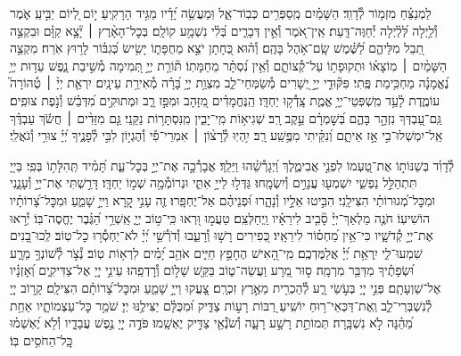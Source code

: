 \documentclass[twoside, openany, parskip=half, 11pt]{book}
\begin{document}
\begin{narrow}
לַמְנַצֵּ֗חַ מִזְמ֥וֹר לְ֯דָוִֽד׃
הַשָּׁמַ֗יִם מְֽסַפְּרִ֥ים כְּבֽוֹד־אֵ֑ל וּֽמַעֲשֵׂ֥ה יָ֝דָ֗יו מַגִּ֥יד הָרָקִֽיעַ׃
י֣וֹם לְ֭יוֹם יַבִּ֣יעַֽ אֹ֑מֶר וְ֯לַ֥יְלָה לְּ֝לַ֗יְלָה יְ֯חַוֶּה־דָּֽעַת׃
אֵֽין־אֹ֭מֶר וְ֯אֵ֣ין דְּבָרִ֑ים בְּ֝לִ֗י נִשְׁמָ֥ע קוֹלָֽם׃
בְּכׇל־הָאָ֨רֶץ ׀ יָ֘צָ֤א קַוָּ֗ם וּבִקְצֵ֣ה תֵ֭בֵל מִלֵּיהֶ֑ם לַ֝שֶּׁ֗מֶשׁ שָֽׂם־אֹ֥הֶל בָּהֶֽם׃
וְ֯ה֗וּא כְּ֭חָתָן יֹצֵ֣א מֵחֻפָּת֑וֹ יָשִׂ֥ישׂ כְּ֝גִבּ֗וֹר לָר֥וּץ אֹֽרַח׃
מִקְצֵ֤ה הַשָּׁמַ֨יִם ׀ מֽוֹצָא֗וֹ וּתְקוּפָת֥וֹ עַל־קְ֯צוֹתָ֑ם וְ֯אֵ֥ין נִ֝סְתָּ֗ר מֵחַמָּתֽוֹ׃
תּ֘וֹרַ֤ת יְיָ֣ תְּ֭מִימָה מְ֯שִׁ֣יבַת נָ֑פֶשׁ עֵד֥וּת יְיָ֥ נֶ֝אֱמָנָ֗ה מַחְכִּ֥ימַת פֶּֽתִי׃
פִּקּ֘וּדֵ֤י יְיָ֣ יְ֭שָׁרִים מְ֯שַׂמְּחֵי־לֵ֑ב מִצְוַ֥ת יְיָ֥ בָּ֝רָ֗ה מְ֯אִירַ֥ת עֵינָֽיִם׃
יִרְאַ֤ת יְיָ֨ ׀ טְ֯הוֹרָה֮ עוֹמֶ֢דֶת לָ֫עַ֥ד מִֽשְׁפְּטֵי־יְיָ֥ אֱמֶ֑ת צָֽדְ֯ק֥וּ יַחְדָּֽו׃
הַֽנֶּחֱמָדִ֗ים מִ֭זָּהָב וּמִפַּ֣ז רָ֑ב וּמְתוּקִ֥ים מִ֝דְּבַ֗שׁ וְ֯נֹ֣פֶת צוּפִֽים׃
גַּֽם־עַ֭בְדְּךָ נִזְהָ֣ר בָּהֶ֑ם בְּ֝שׇׁמְרָ֗ם עֵ֣קֶב רָֽב׃
שְׁגִיא֥וֹת מִֽי־יָבִ֑ין מִֽנִּסְתָּר֥וֹת נַקֵּֽנִי׃
גַּ֤ם מִזֵּדִ֨ים ׀ חֲשֹׂ֬ךְ עַבְדֶּ֗ךָ אַֽל־יִמְשְׁלוּ־בִ֣י אָ֣ז אֵיתָ֑ם וְ֝נִקֵּ֗יתִי מִפֶּ֥שַֽׁע רָֽב׃
יִ֥הְיֽוּ לְ֯רָצ֨וֹן ׀ אִמְרֵי־פִ֡י וְ֯הֶגְי֣וֹן לִבִּ֣י לְ֯פָנֶ֑יךָ יְ֝יָ֗ צוּרִ֥י וְ֯גֹאֲלִֽי׃


\enlargethispage{\baselineskip}

לְ֯דָוִ֗ד
בְּשַׁנּוֹת֣וֹ אֶת־טַ֭עְמוֹ לִפְנֵ֣י אֲבִימֶ֑לֶךְ וַ֝יְגָרְ֯שֵׁ֗הוּ וַיֵּלַֽךְ׃
אֲבָרְ֯כָ֣ה אֶת־יְיָ֣ בְּכׇל־עֵ֑ת תָּ֝מִ֗יד תְּֽהִלָּת֥וֹ בְּפִֽי׃
בַּייָ֭ תִּתְהַלֵּ֣ל נַפְשִׁ֑י יִשְׁמְע֖וּ עֲנָוִ֣ים וְ֯יִשְׂמָֽחוּ׃
גַּדְּל֣וּ לַייָ֣ אִתִּ֑י וּנְרוֹמְ֯מָ֖ה שְׁמ֣וֹ יַחְדָּֽו׃
דָּרַ֣שְׁתִּי אֶת־יְיָ֣ וְ֯עָנָ֑נִי וּמִכׇּל־מְ֝גוּרוֹתַ֗י הִצִּילָֽנִי׃
הִבִּ֣יטוּ אֵלָ֣יו וְ֯נָהָ֑רוּ וּ֝פְנֵיהֶ֗ם אַל־יֶחְפָּֽרוּ׃
זֶ֤ה עָנִ֣י קָ֭רָא וַייָ֣ שָׁמֵ֑עַ וּמִכׇּל־צָ֝רוֹתָ֗יו הוֹשִׁיעֽוֹ׃
חֹנֶ֤ה מַלְאַךְ־יְיָ֓ סָ֘בִ֤יב לִירֵאָ֗יו וַֽיְחַלְּצֵֽם׃
טַעֲמ֣וּ וּ֭רְאוּ כִּֽי־ט֣וֹב יְיָ֑ אַֽשְׁרֵ֥י הַ֝גֶּ֗בֶר יֶחֱסֶה־בּֽוֹ׃
יְ֯ר֣אוּ אֶת־יְיָ֣ קְ֯דֹשָׁ֑יו כִּי־אֵ֥ין מַ֝חְס֗וֹר לִירֵאָֽיו׃
כְּ֭פִירִים רָשׁ֣וּ וְ֯רָעֵ֑בוּ וְ֯דֹרְ֯שֵׁ֥י יְ֝יָ֗ לֹא־יַחְסְ֯ר֥וּ כׇל־טֽוֹב׃
לְֽכוּ־בָ֭נִים שִׁמְעוּ־לִ֑י יִֽרְאַ֥ת יְ֝יָ֗ אֲלַמֶּדְכֶֽם׃
מִֽי־הָ֭אִישׁ הֶחָפֵ֣ץ חַיִּ֑ים אֹהֵ֥ב יָ֝מִ֗ים לִרְא֥וֹת טֽוֹב׃
נְ֯צֹ֣ר לְ֯שׁוֹנְךָ֣ מֵרָ֑ע וּ֝שְׂפָתֶ֗יךָ מִדַּבֵּ֥ר מִרְמָֽה׃
ס֣וּר מֵ֭רָע וַעֲשֵׂה־ט֑וֹב בַּקֵּ֖שׁ שָׁל֣וֹם וְ֯רׇדְפֵֽהוּ׃
עֵינֵ֣י יְיָ֭ אֶל־צַדִּיקִ֑ים וְ֝אׇזְנָ֗יו אֶל־שַׁוְעָתָֽם׃
פְּנֵ֣י יְיָ֭ בְּעֹ֣שֵׂי רָ֑ע לְ֯הַכְרִ֖ית מֵאֶ֣רֶץ זִכְרָֽם׃
צָ֭עֲקוּ וַייָ֣ שָׁמֵ֑עַ וּמִכׇּל־צָ֝רוֹתָ֗ם הִצִּילָֽם׃
קָר֣וֹב יְיָ֭ לְ֯נִשְׁבְּרֵי־לֵ֑ב וְֽאֶת־דַּכְּאֵי־ר֥וּחַ יוֹשִֽׁיעַ׃
רַ֭בּוֹת רָע֣וֹת צַדִּ֑יק וּ֝מִכֻּלָּ֗ם יַצִּילֶ֥נּוּ יְיָ׃
שֹׁמֵ֥ר כׇּל־עַצְמוֹתָ֑יו אַחַ֥ת מֵ֝הֵ֗נָּה לֹ֣א נִשְׁבָּֽרָה׃
תְּמוֹתֵ֣ת רָשָׁ֣ע רָעָ֑ה וְ֯שֹׂנְ֯אֵ֖י צַדִּ֣יק יֶאְשָֽׁמוּ׃
פֹּדֶ֣ה יְיָ֭ נֶ֣פֶשׁ עֲבָדָ֑יו וְ֯לֹ֥א יֶ֝אְשְׁמ֗וּ כׇּֽל־הַחֹסִ֥ים בּֽוֹ׃




\end{narrow}
\end{document}
